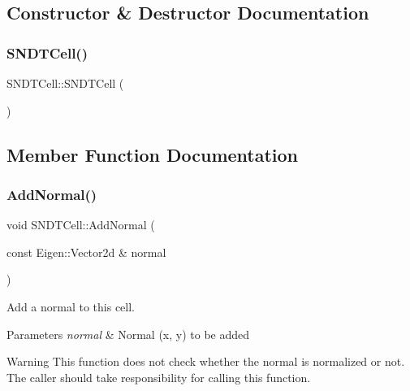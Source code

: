 \subsection{Constructor \& Destructor Documentation}
\mbox{\label{classSNDTCell_a2431d3f2e9bf345f60169c545cea1804}} 
\subsubsection{\texorpdfstring{S\+N\+D\+T\+Cell()}{SNDTCell()}}
{\footnotesize\ttfamily S\+N\+D\+T\+Cell\+::\+S\+N\+D\+T\+Cell (\begin{DoxyParamCaption}{ }\end{DoxyParamCaption})}



\subsection{Member Function Documentation}
\mbox{\label{classSNDTCell_a70e60d446284c39a7f2708fc31b762c8}} 
\subsubsection{\texorpdfstring{Add\+Normal()}{AddNormal()}}
{\footnotesize\ttfamily void S\+N\+D\+T\+Cell\+::\+Add\+Normal (\begin{DoxyParamCaption}\item[{const Eigen\+::\+Vector2d \&}]{normal }\end{DoxyParamCaption})\hspace{0.3cm}{\ttfamily [inline]}}



Add a normal to this cell. 


\begin{DoxyParams}{Parameters}
{\em normal} & Normal (x, y) to be added \\
\hline
\end{DoxyParams}
\begin{DoxyWarning}{Warning}
This function does not check whether the normal is normalized or not. The caller should take responsibility for calling this function. 
\end{DoxyWarning}


